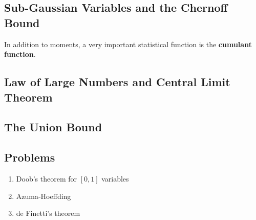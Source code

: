 \documentclass[11pt]{article}
\begin{document}
\subsection{Sub-Gaussian Variables and the Chernoff Bound}
In addition to moments, a very important statistical function is the \textbf{cumulant function}. 
\subsection{Law of Large Numbers and Central Limit Theorem}
\subsection{The Union Bound}
\subsection{Problems}
\begin{enumerate}
\item Doob's theorem for $[0,1]$ variables
\item Azuma-Hoeffding
\item de Finetti's theorem
\end{enumerate}
\end{document}
